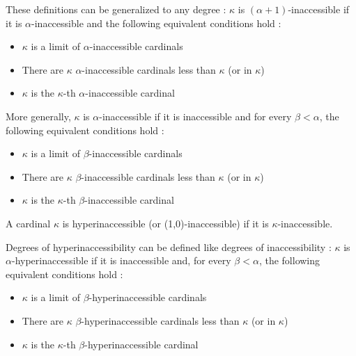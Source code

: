 \documentclass[10pt]{article}
\begin{document}
These definitions can be generalized to any degree : \( \kappa \) is \((\alpha+1)\)-inaccessible if it is \(\alpha\)-inaccessible and the following equivalent conditions hold :

\begin{itemize}
     \setlength{\itemsep}{1pt}
     \setlength{\parskip}{0pt}
     \setlength{\parsep}{0pt}

\item \(\kappa\) is a limit of \(\alpha\)-inaccessible cardinals

\item There are \(\kappa\) \(\alpha\)-inaccessible cardinals less than \(\kappa\) (or in \(\kappa\))

\item \(\kappa\) is the \(\kappa\)-th \(\alpha\)-inaccessible cardinal

\end{itemize}

More generally, \(\kappa\) is \(\alpha\)-inaccessible if it is inaccessible and for every \( \beta < \alpha \), the following equivalent conditions hold :

\begin{itemize}
     \setlength{\itemsep}{1pt}
     \setlength{\parskip}{0pt}
     \setlength{\parsep}{0pt}

\item \(\kappa\) is a limit of \(\beta\)-inaccessible cardinals

\item There are \(\kappa\) \(\beta\)-inaccessible cardinals less than \(\kappa\) (or in \(\kappa\))

\item \(\kappa\) is the \(\kappa\)-th \(\beta\)-inaccessible cardinal

\end{itemize}

A cardinal \(\kappa\) is hyperinaccessible (or (1,0)-inaccessible) if it is \(\kappa\)-inaccessible.

Degrees of hyperinaccessibility can be defined like degrees of inaccessibility : \(\kappa\) is \(\alpha\)-hyperinaccessible if it is inaccessible and, for every \( \beta < \alpha \), the following equivalent conditions hold : 

\begin{itemize}
     \setlength{\itemsep}{1pt}
     \setlength{\parskip}{0pt}
     \setlength{\parsep}{0pt}

\item \(\kappa\) is a limit of \(\beta\)-hyperinaccessible cardinals

\item There are \(\kappa\) \(\beta\)-hyperinaccessible cardinals less than \(\kappa\) (or in \(\kappa\))

\item \(\kappa\) is the \(\kappa\)-th \(\beta\)-hyperinaccessible cardinal

\end{itemize}
\end{document}
